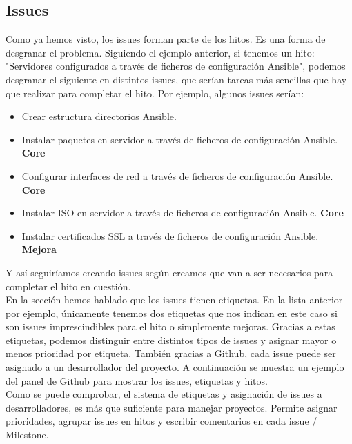 \subsection{Issues}
\begin{text}
        Como ya hemos visto, los issues forman parte de los hitos. Es una forma de desgranar el problema. Siguiendo el ejemplo anterior, si tenemos un hito: "Servidores configurados a través de ficheros de configuración Ansible", podemos desgranar el siguiente en distintos issues, que serían tareas más sencillas que hay que realizar para completar el hito. Por ejemplo, algunos issues serían: 
        \begin{itemize}
                \item Crear estructura directorios Ansible.
                \item Instalar paquetes en servidor a través de ficheros de configuración Ansible. \textbf{Core}
                \item Configurar interfaces de red a través de ficheros de configuración Ansible. \textbf{Core}
                \item Instalar ISO en servidor a través de ficheros de configuración Ansible. \textbf{Core}
                \item Instalar certificados SSL a través de ficheros de configuración Ansible. \textbf{Mejora}
        \end{itemize}

        Y así seguiríamos creando issues según creamos que van a ser necesarios para completar el hito en cuestión. \\
        En la sección   hemos hablado que los issues tienen etiquetas. En la lista anterior por ejemplo, únicamente tenemos dos etiquetas que nos indican en este caso si son issues imprescindibles para el hito o simplemente mejoras. Gracias a estas etiquetas, podemos distinguir entre distintos tipos de issues y asignar mayor o menos prioridad por etiqueta. También gracias a Github, cada issue puede ser asignado a un desarrollador del proyecto. A continuación se muestra un ejemplo del panel de Github para mostrar los issues, etiquetas y hitos. \\
        Como se puede comprobar, el sistema de etiquetas y asignación de issues a desarrolladores, es más que suficiente para manejar proyectos. Permite asignar prioridades, agrupar issues en hitos y escribir comentarios en cada issue / Milestone. 


\end{text}
